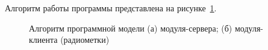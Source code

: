 Алгоритм работы программы представлена на рисунке~\ref{fig:codeblock}.

\begin{figure}[ht]
    \qquad
    \caption{Алгоритм программной модели (а) модуля-сервера; (б) модуля-клиента (радиометки)}
    \label{fig:codeblock}
\end{figure}
